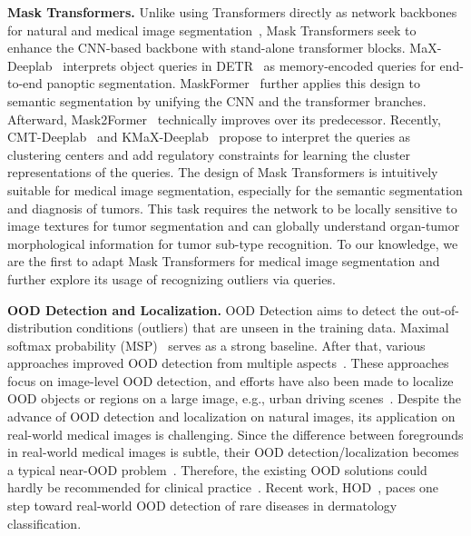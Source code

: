 \documentclass[10pt,twocolumn,letterpaper]{article}
\begin{document}
{\bf Mask Transformers.} Unlike using Transformers directly as network backbones for natural and medical image segmentation~\cite{zheng2021rethinking,liu2021swin,xie2021segformer,strudel2021segmenter,yu2021glance}, Mask Transformers seek to enhance the CNN-based backbone with stand-alone transformer blocks. MaX-Deeplab~\cite{wang2021max} interprets object queries in DETR~\cite{carion2020end} as memory-encoded queries for end-to-end panoptic segmentation. MaskFormer~\cite{cheng2021per} further applies this design to semantic segmentation by unifying the CNN and the transformer branches. Afterward, Mask2Former~\cite{cheng2022masked} technically improves over its predecessor. Recently, CMT-Deeplab~\cite{yu2022cmt} and KMaX-Deeplab~\cite{yu2022k} propose to interpret the queries as clustering centers and add regulatory constraints for learning the cluster representations of the queries.  The design of Mask Transformers is intuitively suitable for medical image segmentation, especially for the semantic segmentation and diagnosis of tumors. This task requires the network to be locally sensitive to image textures for tumor segmentation and can globally understand organ-tumor morphological information for tumor sub-type recognition. To our knowledge, we are the first to adapt Mask Transformers for medical image segmentation and further explore its usage of recognizing outliers via queries. 

{\bf OOD Detection and Localization.} OOD Detection aims to detect the out-of-distribution conditions (outliers) that are unseen in the training data. Maximal softmax probability (MSP)~\cite{hendrycks2016baseline} serves as a strong baseline. After that, various approaches improved OOD detection from multiple aspects~\cite{ood2,ood3,ood4,ood5}. These approaches focus on image-level OOD detection, and efforts have also been made to localize OOD objects or regions on a large image, e.g., urban driving scenes~\cite{hendrycks2016baseline,blum2019fishyscapes, lis2019detecting, chan2021segmentmeifyoucan, xia2020synthesize, jung2021standardized,raml2022,oberdiek2020detection}. Despite the advance of OOD detection and localization on natural images, its application on real-world medical images is challenging. Since the difference between foregrounds in real-world medical images is subtle, their OOD detection/localization becomes a typical near-OOD problem~\cite{winkens2020contrastive,ren2021simple,mirzaei2022fake,dong2022neural}. Therefore, the existing OOD solutions could hardly be recommended for clinical practice~\cite{tian2021constrained,zimmerer2022mood,pinaya2022unsupervised}. Recent work, HOD~\cite{roy2022does}, paces one step toward real-world OOD detection of rare diseases in dermatology classification. 
\end{document}
